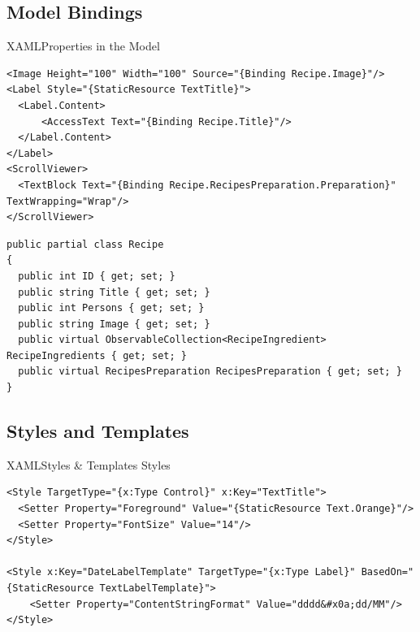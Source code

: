 \subsection{Model Bindings} 
\begin{frame}[fragile]{XAML}{Properties in the Model}

\begin{lstlisting}
<Image Height="100" Width="100" Source="{Binding Recipe.Image}"/>
<Label Style="{StaticResource TextTitle}">
  <Label.Content>
      <AccessText Text="{Binding Recipe.Title}"/>
  </Label.Content>
</Label>
<ScrollViewer>
  <TextBlock Text="{Binding Recipe.RecipesPreparation.Preparation}" TextWrapping="Wrap"/>
</ScrollViewer>
\end{lstlisting}

\begin{lstlisting}
public partial class Recipe
{
  public int ID { get; set; }
  public string Title { get; set; }
  public int Persons { get; set; }
  public string Image { get; set; }
  public virtual ObservableCollection<RecipeIngredient> RecipeIngredients { get; set; }
  public virtual RecipesPreparation RecipesPreparation { get; set; }
}
\end{lstlisting}

\end{frame}


\subsection{Styles and Templates} 
\begin{frame}[fragile]{XAML}{Styles \& Templates}
Styles
\begin{lstlisting}
<Style TargetType="{x:Type Control}" x:Key="TextTitle">
  <Setter Property="Foreground" Value="{StaticResource Text.Orange}"/>
  <Setter Property="FontSize" Value="14"/>
</Style>

<Style x:Key="DateLabelTemplate" TargetType="{x:Type Label}" BasedOn="{StaticResource TextLabelTemplate}">
    <Setter Property="ContentStringFormat" Value="dddd&#x0a;dd/MM"/>
</Style>
\end{lstlisting}

\end{frame}

